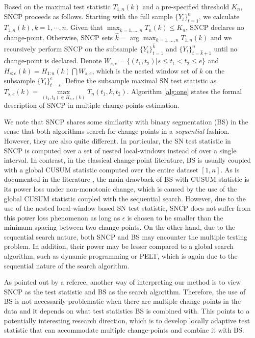 Based on the maximal test statistic $T_{1,n}(k)$ and a pre-specified threshold $K_n$,  SNCP  proceeds as follows. Starting with the full sample $\{Y_t\}_{t=1}^{n}$, we calculate $T_{1,n}(k), k=1,\cdots, n.$ Given that $\max_{k=1,\ldots,n} T_n(k)\leq K_n$, SNCP declares no change-point. Otherwise, SNCP sets $\widehat{k}=\arg\max_{k=1,\ldots,n} T_{1,n}(k)$ and we recursively perform SNCP on the subsample $\{Y_t\}_{t=1}^{\widehat{k}}$ and $\{Y_{t}\}_{t=\widehat{k}+1}^{n}$ until no change-point is declared.  Denote $W_{s,e}=\bigl\{(t_1,t_2)\big\vert s\leq t_1<t_2\leq e \bigl\}$ and $H_{s:e}(k)=H_{1:n}(k)\bigcap W_{s,e}$, which is the nested window set of $k$ on the subsample $\{Y_{t}\}_{t=s}^e$. Define the subsample maximal SN test statistic as $T_{s,e}(k)=\max\limits_{(t_1,t_2)\in H_{s:e}(k)}T_n(t_1,k,t_2).$ Algorithm \ref{alg:one} states the formal description of SNCP in multiple change-points estimation. 


{ We note that SNCP shares some similarity with binary segmentation (BS) in the sense that both algorithms search for change-points in a \textit{sequential} fashion. However, they are also quite different. In particular, the SN test statistic in SNCP is computed over a set of nested local-windows instead of over a single interval. In contrast, in the classical change-point literature, BS is usually coupled with a global CUSUM statistic computed over the entire dataset $[1,n]$. As is documented in the literature \citep{shao2010self}, the main drawback of BS {with CUSUM statistic} is its power loss under non-monotonic change, which is  caused by the use of the global CUSUM statistic coupled with the sequential search. However, due to the use of the nested local-window based SN test statistic, SNCP does not suffer from this power loss phenomenon as long as $\epsilon$ is chosen to be smaller than the minimum spacing between two change-points.  On the other hand, due to the  sequential  search nature, both SNCP and BS may encounter the multiple testing problem. In addition, their power may be lesser compared to a global search algorithm, such as dynamic programming or PELT, which is again due to the sequential nature of the search algorithm.
}

{As pointed out by a referee, another way of interpreting our method is to view SNCP as the test statistic and BS as the search algorithm. 
Therefore, the use of BS is not necessarily problematic when there are multiple change-points in the data and it depends on what test statistics BS is combined with. This points to a potentially interesting research direction, which is to develop locally adaptive test statistic that can accommodate multiple change-points and combine it with BS.




}

